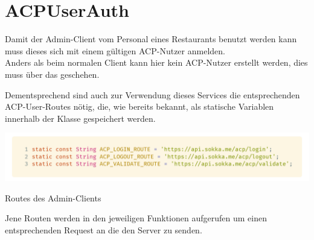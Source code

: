 \section{ACPUserAuth}

Damit der Admin-Client vom Personal eines Restaurants benutzt werden kann muss dieses sich mit 
einem gültigen ACP-Nutzer anmelden.\\
Anders als beim normalen Client kann hier kein ACP-Nutzer erstellt werden, dies muss über das
 geschehen.

Dementsprechend sind auch zur Verwendung dieses Services die entsprechenden ACP-User-Routes nötig,
die, wie bereits bekannt, als statische Variablen innerhalb der Klasse gespeichert werden.

\begin{code}[H]
    \centering
    \includegraphics[width=1\textwidth]{images/Admin-Client/services/acpuserauth/acproutes.png}
    \vspace{-25pt}
    \caption{Routes des Admin-Clients}
\end{code}

Jene Routen werden in den jeweiligen Funktionen aufgerufen um einen entsprechenden Request an
die den Server zu senden.